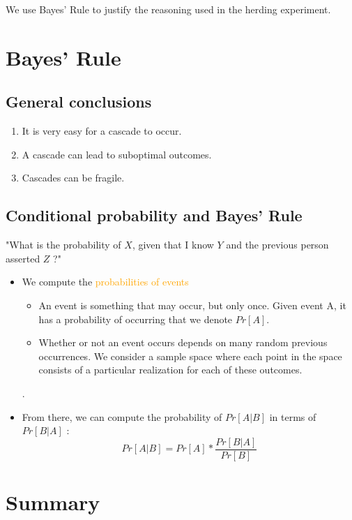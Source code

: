 We use Bayes' Rule to justify the reasoning used in the herding experiment.

\section{Bayes' Rule}

\subsection{General conclusions}

\begin{enumerate}
\item It is very easy for a cascade to occur.
\item A cascade can lead to suboptimal outcomes.
\item Cascades can be fragile.
\end{enumerate}

\subsection{Conditional probability and Bayes' Rule}

"What is the probability of $X$, given that I know $Y$ and the previous person asserted $Z$ ?"
\begin{itemize}
\item We compute the \textcolor{orange}{probabilities of events}
	\begin{itemize}
	\item An event is something that may occur, but only once. Given event A, it has a probability of occurring that we denote $Pr[A]$.
	\item Whether or not an event occurs depends on many random previous occurrences. We consider a sample space where each point in the space consists of a particular realization for each of these outcomes.
	\end{itemize}.
\item From there, we can compute the probability of $Pr[A|B]$ in terms of $Pr[B|A]$ :
	\begin{equation}
	Pr[A|B] = Pr[A] * \frac{Pr[B|A]}{Pr[B]}
	\end{equation}
\end{itemize}

\section{Summary}

